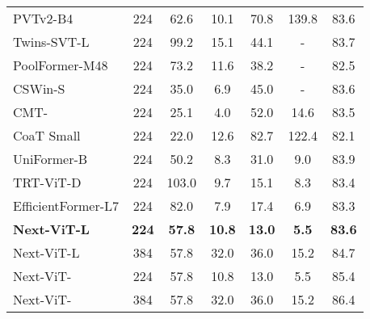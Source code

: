 \documentclass[10pt,twocolumn,letterpaper]{article}
\begin{document}
\begin{table}[]
{\begin{tabular}{l|c|cc|cc|c}
    PVTv2-B4\cite{PVT_v2}          &224    &62.6        &10.1   &70.8     &  139.8      & 83.6        \\
    Twins-SVT-L \cite{Twins}            &224            & 99.2      & 15.1      & 44.1    & -     & 83.7        \\
    PoolFormer-M48\cite{metaformer}          &224         & 73.2      & 11.6       &38.2          &  -     & 82.5        \\
    CSWin-S\cite{CSWin}                &224           & 35.0      & 6.9       & 45.0     & -     & 83.6        \\
    CMT-\cite{Cmt}    &224  & 25.1      & 4.0       & 52.0     & 14.6          & 83.5        \\
    CoaT Small\cite{CoaT}  &224          & 22.0      & 12.6       & 82.7     & 122.4          & 82.1        \\
    UniFormer-B\cite{uniformer}   &224                & 50.2      & 8.3       & 31.0        & 9.0      & 83.9        \\
    TRT-ViT-D\cite{xia2022trt}     &224              & 103.0     & 9.7       & 15.1           &8.3     & 83.4        \\
    EfficientFormer-L7\cite{li2022efficientformer} &224 & 82.0      & 7.9       & 17.4     & 6.9          & 83.3        \\
    \textbf{Next-ViT-L}    &\textbf{224}       & \textbf{57.8}      & \textbf{10.8}      & \textbf{13.0}    & \textbf{5.5}         & \textbf{83.6}        \\  
    Next-ViT-L       &384         & 57.8      & 32.0      & 36.0    &15.2         & 84.7        \\
    Next-ViT-       &224         & 57.8      & 10.8      & 13.0    &5.5         & 85.4        \\
    Next-ViT-       &384         & 57.8      & 32.0      & 36.0    &15.2         & 86.4        \\
    \bottomrule
    \end{tabular}
    }
\end{table}
\end{document}
